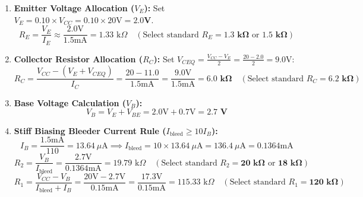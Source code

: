 \documentclass[11pt,a4paper,oneside]{book}
\begin{document}
\begin{enumerate}[leftmargin=1.5em]
  \item \textbf{Emitter Voltage Allocation ($V_E$):}
  Set $V_E = 0.10 \times V_{CC} = 0.10 \times 20\text{V} = \mathbf{2.0\text{V}}$.
  \[
  R_E = \frac{V_E}{I_E} \approx \frac{2.0\text{V}}{1.5\text{mA}} = 1.33\text{ k}\Omega \quad (\text{Select standard } R_E = \mathbf{1.3\text{ k}\Omega}\text{ or } \mathbf{1.5\text{ k}\Omega})
  \]
  \item \textbf{Collector Resistor Allocation ($R_C$):}
  Set $V_{CEQ} = \frac{V_{CC} - V_E}{2} = \frac{20 - 2.0}{2} = 9.0\text{V}$:
  \[
  R_C = \frac{V_{CC} - (V_E + V_{CEQ})}{I_C} = \frac{20 - 11.0}{1.5\text{mA}} = \frac{9.0\text{V}}{1.5\text{mA}} = \mathbf{6.0\text{ k}\Omega} \quad (\text{Select standard } R_C = \mathbf{6.2\text{ k}\Omega})
  \]
  \item \textbf{Base Voltage Calculation ($V_B$):}
  \[
  V_B = V_E + V_{BE} = 2.0\text{V} + 0.7\text{V} = \mathbf{2.7\text{ V}}
  \]
  \item \textbf{Stiff Biasing Bleeder Current Rule ($I_{\text{bleed}} \ge 10 I_B$):}
  \[
  I_B = \frac{1.5\text{mA}}{110} = 13.64\ \mu\text{A} \implies I_{\text{bleed}} = 10 \times 13.64\ \mu\text{A} = 136.4\ \mu\text{A} = 0.1364\text{mA}
  \]
  \[
  R_2 = \frac{V_B}{I_{\text{bleed}}} = \frac{2.7\text{V}}{0.1364\text{mA}} = 19.79\text{ k}\Omega \quad (\text{Select standard } R_2 = \mathbf{20\text{ k}\Omega}\text{ or } \mathbf{18\text{ k}\Omega})
  \]
  \[
  R_1 = \frac{V_{CC} - V_B}{I_{\text{bleed}} + I_B} = \frac{20\text{V} - 2.7\text{V}}{0.15\text{mA}} = \frac{17.3\text{V}}{0.15\text{mA}} = 115.33\text{ k}\Omega \quad (\text{Select standard } R_1 = \mathbf{120\text{ k}\Omega})
  \]
\end{enumerate}
\end{document}
